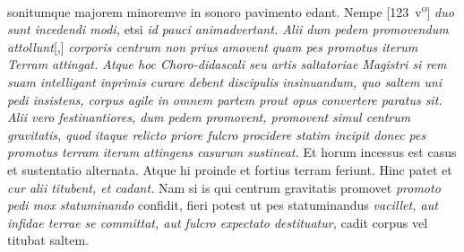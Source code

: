{{sonitumque majorem minoremve in sonoro pavimento edant.
Nempe}
%
[123~v\textsuperscript{o}] %
%
\textit{duo sunt incedendi modi,}
etsi \textit{id pauci animadvertant.
Alii dum pedem\protect{} promovendum attollunt}[,]
\textit{corporis centrum 
non prius amovent quam pes promotus
iterum Terram\protect{} attingat.
Atque hoc Choro-didascali seu artis saltatoriae Magistri
si rem suam intelligant inprimis curare debent discipulis
insinuandum, quo saltem uni pedi insistens,
corpus agile in omnem partem
prout opus convertere paratus sit.
Alii vero festinantiores, dum pedem promovent,
promovent simul centrum gravitatis,
quod itaque relicto priore fulcro\protect{}
procidere statim incipit
donec pes promotus terram\protect{}
iterum attingens casurum sustineat.}
Et horum incessus\protect{} est casus et sustentatio alternata.
Atque hi proinde et fortius terram feriunt.
Hinc patet et \textit{cur alii
titubent, et cadant.}
Nam si is qui centrum gravitatis\protect{} promovet
\textit{promoto pedi mox statuminando} confidit,
fieri potest ut pes\protect{} statuminandus
\textit{vacillet, aut infidae terrae\protect{} se committat,
aut fulcro expectato destituatur,}
cadit corpus vel titubat saltem.}{%
%
}
%
\pend
\pstart
